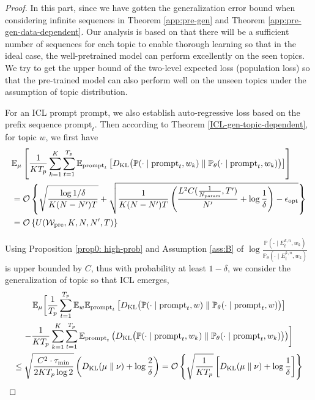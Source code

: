\begin{proof}
	In this part, since we have gotten the generalization error bound when considering infinite sequences in Theorem \ref{app:pre-gen} and Theorem \ref{app:pre-gen-data-dependent}. Our analysis is based on that there will be a sufficient number of sequences for each topic to enable thorough learning so that in the ideal case, the well-pretrained model can perform excellently on the seen topics. We try to get the upper bound of the two-level expected loss (population loss) so that the pre-trained model can also perform well on the unseen topics under the assumption of topic distribution. 

    For an ICL prompt $\text{prompt}$, we also establish auto-regressive loss based on the prefix sequence $\text{prompt}_{t}$. Then according to Theorem \ref{ICL-gen-topic-dependent}, for topic $w$, we first have
    {\small \begin{align}
		&\mathbb{E}_{\mu}\left[\frac{1}{KT_p}\sum_{k=1}^K\sum_{t=1}^{T_p}\mathbb{E}_{\text{prompt}_{t}}\left[D_{\mathrm{KL}}\big(\mathbb{P}(\cdot\mid \text{prompt}_{t},w_k)\parallel \mathbb{P}_{\theta}(\cdot\mid \text{prompt}_{t},w_k)\big)\right]\right] \nonumber\\
		&=\mathcal{O}\left\{\sqrt{\frac{\log 1/\delta}{K(N-N^\prime)T}}+\sqrt{\frac{1}{K(N-N^\prime)T}\left(\frac{L^2C(\frac{1}{N_{\text{param}}},{T^\prime})}{N^\prime}+\log \frac{1}{\delta}\right)-\epsilon_{\text{opt}}}\right\}\nonumber \\
        &=\mathcal{O}\left\{U(\mathcal{W}_{\text{pre}},K,N,N^\prime,T)\right\}
	\end{align}}
    
	Using Proposition \ref{prop0: high-prob} and Assumption \ref{ass:B} of $\log \frac{\mathbb{P}(\cdot\mid E^{k,n}_t,w_k)}{\mathbb{P}_{\theta}(\cdot\mid E^{k,n}_t,w_k)}$ is upper bounded by $C$, thus with probability at least $1-\delta$, we consider the generalization of topic so that ICL emerges,
	{\small 
		\begin{multline}
			\mathbb{E}_{\mu}\biggl[\frac{1}{T_p}\sum_{t=1}^{T_p}\mathbb{E}_{w}\mathbb{E}_{\text{prompt}_{t}}\left[D_{\mathrm{KL}}\big(\mathbb{P}(\cdot\mid \text{prompt}_{t},w)\parallel \mathbb{P}_{\theta}(\cdot\mid \text{prompt}_{t},w)\big)\right] \\-\frac{1}{KT_p}\sum_{k=1}^K\sum_{t=1}^{T_p}\mathbb{E}_{\text{prompt}_{t}}\left(D_{\mathrm{KL}}\big(\mathbb{P}(\cdot\mid \text{prompt}_{t},w_k)\parallel \mathbb{P}_{\theta}(\cdot\mid \text{prompt}_{t},w_k)\big)\right)\biggr] \\
			\leq \sqrt{\frac{C^2\cdot \tau_{\min}}{2KT_p \log 2}}\left(D_{\mathrm{KL}}(\mu\parallel \nu)+\log \frac{2}{\delta}\right)=\mathcal{O}\left\{\sqrt{\frac{1}{KT_p}}\left[D_{\mathrm{KL}}(\mu\parallel \nu)+\log \frac{1}{\delta}\right]\right\}
		\end{multline}
	}
	

\end{proof}

